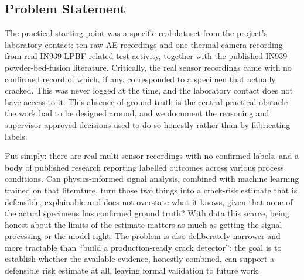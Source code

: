 \documentclass[a4paper]{article}
\begin{document}
\subsection{Problem Statement}
The practical starting point was a specific real dataset from the project's laboratory contact: ten raw AE recordings and one thermal-camera recording from real IN939 LPBF-related test activity, together with the published IN939 powder-bed-fusion literature. Critically, the real sensor recordings came with no confirmed record of which, if any, corresponded to a specimen that actually cracked. This was never logged at the time, and the laboratory contact does not have access to it. This absence of ground truth is the central practical obstacle the work had to be designed around, and we document the reasoning and supervisor-approved decisions used to do so honestly rather than by fabricating labels.

Put simply: there are real multi-sensor recordings with no confirmed labels, and a body of published research reporting labelled outcomes across various process conditions. Can physics-informed signal analysis, combined with machine learning trained on that literature, turn those two things into a crack-risk estimate that is defensible, explainable and does not overstate what it knows, given that none of the actual specimens has confirmed ground truth? With data this scarce, being honest about the limits of the estimate matters as much as getting the signal processing or the model right. The problem is also deliberately narrower and more tractable than ``build a production-ready crack detector'': the goal is to establish whether the available evidence, honestly combined, can support a defensible risk estimate at all, leaving formal validation to future work.
\end{document}
